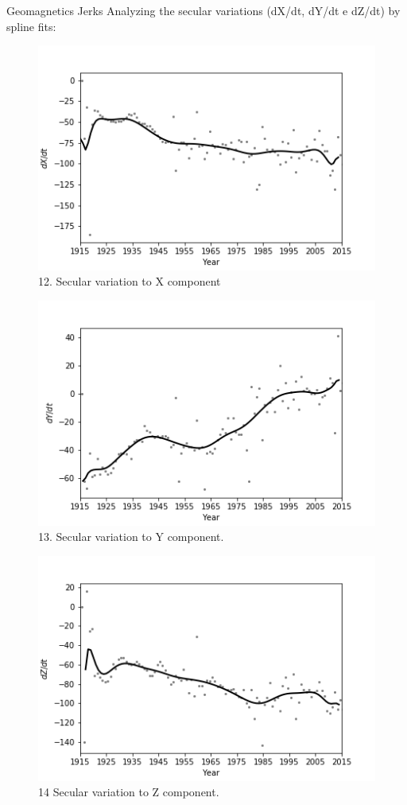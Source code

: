 \documentclass[final,t]{beamer}
\begin{document}
\begin{columns}[t]
\begin{column}{.66\linewidth}
\begin{columns}
\begin{column}{.31\linewidth}
\begin{block}{Geomagnetics Jerks}
Analyzing the secular variations (dX/dt, dY/dt e dZ/dt) by spline fits: 		
		\begin{figure}
			\centering
			\includegraphics[width=0.7\linewidth]{spline101sv_X_spline}
			\caption{12. Secular variation to X component}
			\label{SPLINEx}
		\end{figure}
		
		\begin{figure}
			\centering
			\includegraphics[width=0.7\linewidth]{spline100sv_y_spline}
			\caption{13. Secular variation to Y component.}
			\label{SPLINEy}
		\end{figure}
		
		\begin{figure}
			\centering
			\includegraphics[width=0.7\linewidth]{spline100sv_z_spline}
			\caption{14 Secular variation to Z component.}
			\label{Splinez}
		\end{figure}
		

\end{block}
\end{column}
\end{columns}
\end{column}
\end{columns}
\end{document}
